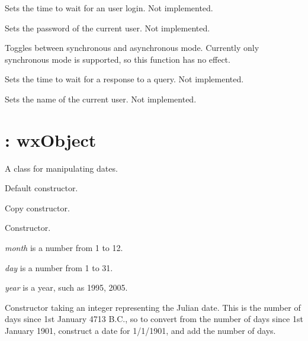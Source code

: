 
Sets the time to wait for an user login. Not implemented.
  


Sets the password of the current user. Not implemented.



Toggles between synchronous and asynchronous mode. Currently only synchronous
mode is supported, so this function has no effect.



Sets the time to wait for a response to a query. Not implemented.
 


Sets the name of the current user. Not implemented.

\section{: wxObject}\label{wxdate}

A class for manipulating dates.



Default constructor.


Copy constructor.


Constructor.

{\it month} is a number from 1 to 12.

{\it day} is a number from 1 to 31.

{\it year} is a year, such as 1995, 2005.


Constructor taking an integer representing the Julian date. This is the number of days since
1st January 4713 B.C., so to convert from the number of days since 1st January 1901,
construct a date for 1/1/1901, and add the number of days.

